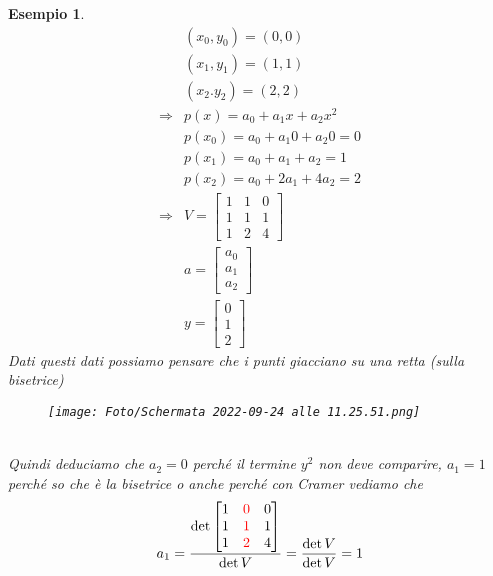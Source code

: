 \documentclass[a4paper, portrait]{book}
\numberwithin{equation}{chapter} %
\newtheorem{example}{Esempio}
\begin{document}
\begin{example}
    \begin{align}
        &(x_0,y_0) = (0,0)\\
        &(x_1,y_1) = (1,1)\\
        &(x_2.y_2) = (2,2)\\
        \Rightarrow &p(x) = a_0 + a_1 x + a_2 x^2\\
        &p(x_0) = a_0 + a_1 0 + a_2 0 = 0\\
        &p(x_1) = a_0 + a_1 + a_2 = 1\\
        &p(x_2) = a_0 + 2 a_1 + 4 a_2 = 2\\
        \Rightarrow &V = \begin{bmatrix}
            1&1&0\\
            1&1&1\\
            1&2&4
        \end{bmatrix}\\
        &a = \begin{bmatrix}
            a_0\\
            a_1\\
            a_2
        \end{bmatrix}\\
        &y = \begin{bmatrix}
            0\\1\\2
        \end{bmatrix}
    \end{align}
    Dati questi dati possiamo pensare che i punti giacciano su una retta (sulla bisetrice)
    \begin{figure}[h!]
        \centering
        \texttt{[image: Foto/Schermata 2022-09-24 alle 11.25.51.png]}
        \caption{}
    \end{figure}
    \\Quindi deduciamo che $a_2 = 0$ perché il termine $y^2$ non deve comparire, $a_1 = 1$ perché so che è la bisetrice o anche perché con Cramer vediamo che
    \begin{equation}
        a_1 = \frac{\det \begin{bmatrix}
            1&\color{red}{0}&0\\
            1&\color{red}{1}&1\\
            1&\color{red}{2}&4
        \end{bmatrix}}{\det V} = \frac{\det V}{\det V} = 1
    \end{equation}
\end{example}
\end{document}
